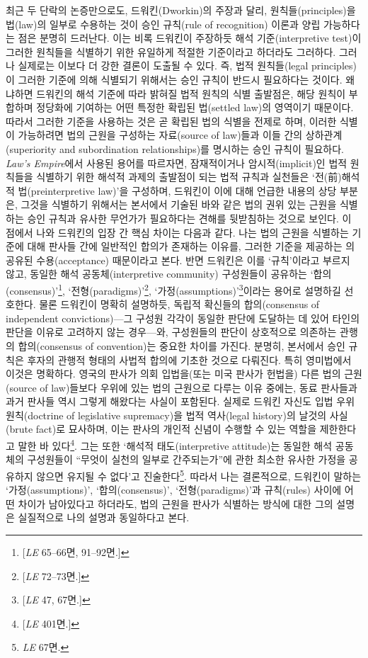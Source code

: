 최근 두 단락의 논증만으로도, 드워킨(Dworkin)의 주장과 달리,
원칙들(principles)을 법(law)의 일부로 수용하는 것이 승인 규칙(rule of
recognition) 이론과 양립 가능하다는 점은 분명히 드러난다. 이는 비록
드워킨이 주장하듯 해석 기준(interpretive test)이 그러한 원칙들을
식별하기 위한 유일하게 적절한 기준이라고 하더라도 그러하다. 그러나
실제로는 이보다 더 강한 결론이 도출될 수 있다. 즉, 법적 원칙들(legal
principles)이 그러한 기준에 의해 식별되기 위해서는 승인 규칙이 반드시
필요하다는 것이다. 왜냐하면 드워킨의 해석 기준에 따라 밝혀질 법적 원칙의
식별 출발점은, 해당 원칙이 부합하며 정당화에 기여하는 어떤 특정한 확립된
법(settled law)의 영역이기 때문이다. 따라서 그러한 기준을 사용하는 것은
곧 확립된 법의 식별을 전제로 하며, 이러한 식별이 가능하려면 법의 근원을
구성하는 자료(source of law)들과 이들 간의 상하관계(superiority and
subordination relationships)를 명시하는 승인 규칙이 필요하다.
\emph{Law's Empire}에서 사용된 용어를 따르자면, 잠재적이거나
암시적(implicit)인 법적 원칙들을 식별하기 위한 해석적 과제의 출발점이
되는 법적 규칙과 실천들은 `전(前)해석적 법(preinterpretive law)'을
구성하며, 드워킨이 이에 대해 언급한 내용의 상당 부분은, 그것을 식별하기
위해서는 본서에서 기술된 바와 같은 법의 권위 있는 근원을 식별하는 승인
규칙과 유사한 무언가가 필요하다는 견해를 뒷받침하는 것으로 보인다. 이
점에서 나와 드워킨의 입장 간 핵심 차이는 다음과 같다. 나는 법의 근원을
식별하는 기준에 대해 판사들 간에 일반적인 합의가 존재하는 이유를, 그러한
기준을 제공하는 의 공유된 수용(acceptance)
때문이라고 본다. 반면 드워킨은 이를 `규칙'이라고 부르지 않고, 동일한
해석 공동체(interpretive community) 구성원들이 공유하는
`합의(consensus)'\footnote{{[}\emph{LE} 65--66면, 91--92면.{]}},
`전형(paradigms)'\footnote{{[}\emph{LE} 72--73면.{]}},
`가정(assumptions)'\footnote{{[}\emph{LE} 47, 67면.{]}}이라는 용어로
설명하길 선호한다. 물론 드워킨이 명확히 설명하듯, 독립적 확신들의
합의(consensus of independent convictions)---그 구성원 각각이 동일한
판단에 도달하는 데 있어 타인의 판단을 이유로 고려하지 않는 경우---와,
구성원들의 판단이 상호적으로 의존하는 관행의 합의(consensus of
convention)는 중요한 차이를 가진다. 분명히, 본서에서 승인 규칙은 후자의
관행적 형태의 사법적 합의에 기초한 것으로 다뤄진다. 특히 영미법에서
이것은 명확하다. 영국의 판사가 의회 입법을(또는 미국 판사가 헌법을) 다른
법의 근원(source of law)들보다 우위에 있는 법의 근원으로 다루는 이유
중에는, 동료 판사들과 과거 판사들 역시 그렇게 해왔다는 사실이 포함된다.
실제로 드워킨 자신도 입법 우위 원칙(doctrine of legislative supremacy)을
법적 역사(legal history)의 날것의 사실(brute fact)로 묘사하며, 이는
판사의 개인적 신념이 수행할 수 있는 역할을 제한한다고 말한 바
있다\footnote{{[}\emph{LE} 401면.{]}}. 그는 또한 `해석적
태도(interpretive attitude)는 동일한 해석 공동체의 구성원들이 ``무엇이
실천의 일부로 간주되는가''에 관한 최소한 유사한 가정을 공유하지 않으면
유지될 수 없다'고 진술한다\footnote{\emph{LE} 67면.}. 따라서 나는
결론적으로, 드워킨이 말하는 `가정(assumptions)', `합의(consensus)',
`전형(paradigms)'과 규칙(rules) 사이에 어떤 차이가 남아있다고 하더라도,
법의 근원을 판사가 식별하는 방식에 대한 그의 설명은 실질적으로 나의
설명과 동일하다고 본다.

